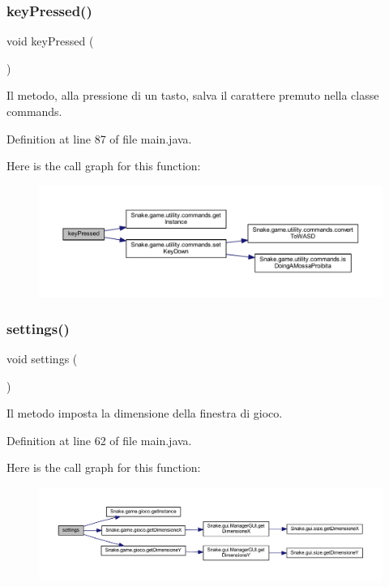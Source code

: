 \subsubsection{\texorpdfstring{key\+Pressed()}{keyPressed()}}
{\footnotesize\ttfamily void key\+Pressed (\begin{DoxyParamCaption}{ }\end{DoxyParamCaption})}



Il metodo, alla pressione di un tasto, salva il carattere premuto nella classe commands. 



Definition at line 87 of file main.\+java.

Here is the call graph for this function\+:
\nopagebreak
\begin{figure}[H]
\begin{center}
\leavevmode
\includegraphics[width=350pt]{classmain_a908174a144ef32ef52d3cd01b7194f59_cgraph}
\end{center}
\end{figure}
\mbox{\label{classmain_a6071c2f6a6eab58f29a7a5baf3696e6b}} 
\subsubsection{\texorpdfstring{settings()}{settings()}}
{\footnotesize\ttfamily void settings (\begin{DoxyParamCaption}{ }\end{DoxyParamCaption})}



Il metodo imposta la dimensione della finestra di gioco. 



Definition at line 62 of file main.\+java.

Here is the call graph for this function\+:
\nopagebreak
\begin{figure}[H]
\begin{center}
\leavevmode
\includegraphics[width=350pt]{classmain_a6071c2f6a6eab58f29a7a5baf3696e6b_cgraph}
\end{center}
\end{figure}
\mbox{\label{classmain_a4fc01d736fe50cf5b977f755b675f11d}} 
